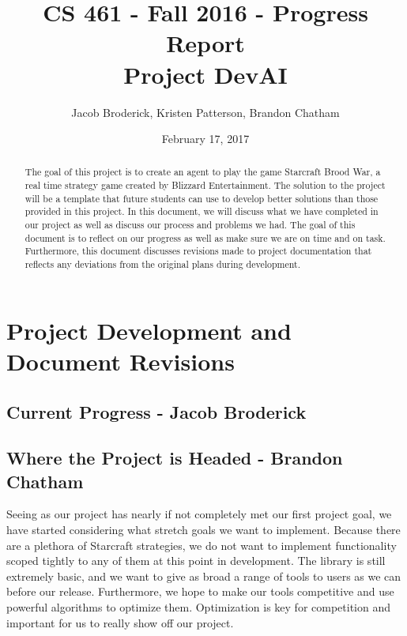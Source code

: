 \documentclass[10pt,letterpaper,onecolumn,draftclsnofoot]{IEEEtran}
\begin{document}
	
	\begin{titlepage}
		
		\title{CS 461 - Fall 2016 - Progress Report \\ Project DevAI}
		\author{Jacob Broderick, Kristen Patterson, Brandon Chatham}
		\date{February 17, 2017}
		\maketitle
		\vspace{4cm}
		\begin{abstract}
			\noindent 
			\noindent
			The goal of this project is to create an agent to play the game Starcraft Brood War, a real time strategy game created by Blizzard Entertainment. The solution to the project will be a template that future students can use to develop better solutions than those provided in this project. In this document, we will discuss what we have completed in our project as well as discuss our process and problems we had. The goal of this document is to reflect on our progress as well as make sure we are on time and on task. Furthermore, this document discusses revisions made to project documentation that reflects any deviations from the original plans during development.
		\end{abstract}
	\end{titlepage}
	
	\section{Project Development and Document Revisions}
	
	\subsection{Current Progress - Jacob Broderick}
	

	\subsection{Where the Project is Headed - Brandon Chatham}
	Seeing as our project has nearly if not completely met our first project goal, we have started considering what stretch goals we want to implement. Because there are a plethora of Starcraft strategies, we do not want to implement functionality scoped tightly to any of them at this point in development. The library is still extremely basic, and we want to give as broad a range of tools to users as we can before our release. Furthermore, we hope to make our tools competitive and use powerful algorithms to optimize them. Optimization is key for competition and important for us to really show off our project.
\end{document}
